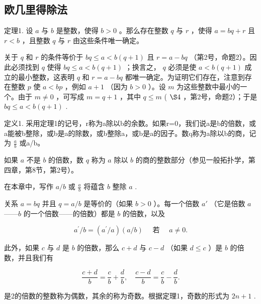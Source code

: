 \subsection{欧几里得除法}

定理1. 设 \(a\) 与 \(b\) 是整数，使得 \(b > 0\) 。那么存在整数 \(q\) 与 \(r\) ，使得 \(a = bq + r\) 且 \(r < b\) ，且整数 \(q\) 与 \(r\) 由这些条件唯一确定。

关于 \(q\) 和 \(r\) 的条件等价于 \(bq \leqslant a < b(q + 1)\) 且 \(r = a - bq\) （第2号，命题2）。因此必须找到 \(q\) 使得 \(bq \leqslant a < b(q + 1)\) ；换言之， \(q\) 必须是使 \(a < b(q + 1)\) 成立的最小整数，这表明 \(q\) 和 \(r = a - bq\) 都唯一确定。为证明它们存在，注意到存在整数 \(p\) 使 \(a < bp\) ，例如 \(a + 1\) （因为 \(b > 0\) ）。设 \(m\) 为这些整数中最小的一个。由于 \(m \neq 0\) ，可写成 \(m = q + 1\) ，其中 \(q \leqslant m\) ( \(\S 4\) ，第2号，命题2）；于是 \(bq \leqslant a < b(q + 1)\) .

定义1. 采用定理1的记号，r称为a除以b的余数。如果r=0，我们说a是b的倍数，或a能被b整除，或b是a的除数，或b整除a，或b是a的因子。数q称为a除以b的商，记为 \(\frac{a}{b}\) 或a/b。

如果 \(a\) 不是 \(b\) 的倍数，数 \(q\) 称为 \(a\) 除以 \(b\) 的商的整数部分（参见一般拓扑学，第四章，第8节，第2号）。

在本章中，写作 \(a / b\) 或 \(\frac{a}{b}\) 将蕴含 \(b\) 整除 \(a\) .

关系 \(a = bq\) 并且 \(q = a / b\) 是等价的（如果 \(b > 0\) ）。每一个倍数 \(a'\) （它是倍数 \(a\) ——\(b\) 的一个倍数——的倍数）都是 \(b\) 的倍数，以及

\[
a ^ {\prime} / b = (a ^ {\prime} / a) (a / b) \quad \text { 若 } \quad a \neq 0.
\]

此外，如果 \(c\) 与 \(d\) 是 \(b\) 的倍数，那么 \(c + d\) 与 \(c - d\) （如果 \(d \leqslant c\) ）是 \(b\) 的倍数，并且我们有

\[
\frac {c + d}{b} = \frac {c}{b} + \frac {d}{b}, \quad \frac {c - d}{b} = \frac {c}{b} - \frac {d}{b}.
\]

是2的倍数的整数称为偶数，其余的称为奇数。根据定理1，奇数的形式为 \(2n + 1\) .

